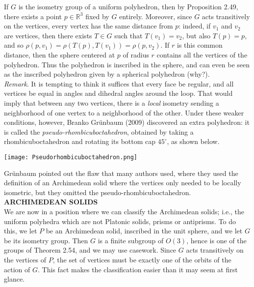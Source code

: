 \documentclass[leqno]{book}
\begin{document}
If $G$ is the isometry group of a uniform polyhedron, then by Proposition 2.49, there exists a point $p\in\mathbb R^3$ fixed by $G$ entirely.  Moreover, since $G$ acts transitively on the vertices, every vertex has the same distance from $p$: indeed, if $v_1$ and $v_2$ are vertices, then there exists $T\in G$ such that $T(v_1)=v_2$, but also $T(p)=p$, and so $\rho(p,v_1)=\rho(T(p),T(v_1))=\rho(p,v_2)$.  If $r$ is this common distance, then the sphere centered at $p$ of radius $r$ contains all the vertices of the polyhedron.  Thus the polyhedron is inscribed in the sphere, and can even be seen as the inscribed polyhedron given by a spherical polyhedron (why?).\\

\noindent\emph{Remark}. It is tempting to think it suffices that every face be regular, and all vertices be equal in angles and dihedral angles around the loop.  That would imply that between any two vertices, there is a \emph{local} isometry sending a neighborhood of one vertex to a neighborhood of the other.  Under these weaker conditions, however, Branko Gr\"unbaum (2009) discovered an extra polyhedron: it is called the \emph{pseudo-rhombicuboctahedron}, obtained by taking a rhombicuboctahedron and rotating its bottom cap $45^\circ$, as shown below.
\begin{center}
\texttt{[image: Pseudorhombicuboctahedron.png]}
\end{center}
Gr\"unbaum pointed out the flaw that many authors used, where they used the definition of an Archimedean solid where the vertices only needed to be locally isometric, but they omitted the pseudo-rhombicuboctahedron.\\

\noindent\textbf{ARCHIMEDEAN SOLIDS}\\

\noindent We are now in a position where we can classify the Archimedean solids; i.e., the uniform polyhedra which are not Platonic solids, prisms or antiprisms.  To do this, we let $P$ be an Archimedean solid, inscribed in the unit sphere, and we let $G$ be its isometry group.  Then $G$ is a finite subgroup of $O(3)$, hence is one of the groups of Theorem 2.54, and we may use casework.  Since $G$ acts transitively on the vertices of $P$, the set of vertices must be exactly one of the orbits of the action of $G$.  This fact makes the classification easier than it may seem at first glance.
\end{document}
